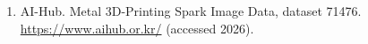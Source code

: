 \begin{enumerate}
\item AI-Hub. Metal 3D-Printing Spark Image Data, dataset 71476. \url{https://www.aihub.or.kr/} (accessed 2026).
\end{enumerate}
